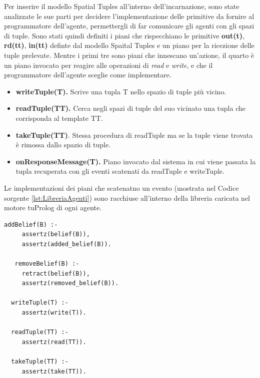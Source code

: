 \documentclass[12pt,a4paper,openright,twoside]{report}
\begin{document}
Per inserire il modello Spatial Tuples all'interno dell'incarnazione, sono state analizzate le sue parti per decidere l'implementazione delle primitive da fornire al programmatore dell'agente, permettergli di far comunicare gli agenti con gli spazi di tuple. Sono stati quindi definiti i piani che rispecchiano le primitive \textbf{out(t)}, \textbf{rd(tt)}, \textbf{in(tt)} definte dal modello Spaital Tuples e un piano per la ricezione delle tuple prelevate. Mentre i primi tre sono piani che innescano un'azione, il quarto \`e un piano invocato per reagire alle operazioni di \textit{read} e \textit{write}, e che il programmatore dell'agente sceglie come implementare.

\begin{itemize}
   \item \textbf{writeTuple(T).} Scrive una tupla T nello spazio di tuple pi\`u vicino.
   \item \textbf{readTuple(TT).} Cerca negli spazi di tuple del suo vicinato una tupla che corrisponda al template TT.
   \item \textbf{takeTuple(TT)}. Stessa procedura di readTuple ma se la tuple viene trovata \`e rimossa dallo spazio di tuple.
   \item \textbf{onResponseMessage(T).} Piano invocato dal sistema in cui viene passata la tupla recuperata con gli eventi scatenati da readTuple e writeTuple.
\end{itemize}

Le implementazioni dei piani che scatenatno un evento (mostrata nel Codice sorgente \ref{lst:LibreriaAgenti}) sono racchiuse all'interno della libreria caricata nel motore tuProlog di ogni agente.

\medskip
{}
\begin{lstlisting}[firstnumber=1,label={lst:LibreriaAgenti},caption={Libreria agenti}]
   addBelief(B) :-
     assertz(belief(B)),
     assertz(added_belief(B)).

   removeBelief(B) :-
     retract(belief(B)),
     assertz(removed_belief(B)).

  writeTuple(T) :-
     assertz(write(T)).

  readTuple(TT) :-
     assertz(read(TT)).

  takeTuple(TT) :-
     assertz(take(TT)).
\end{lstlisting}
\end{document}
